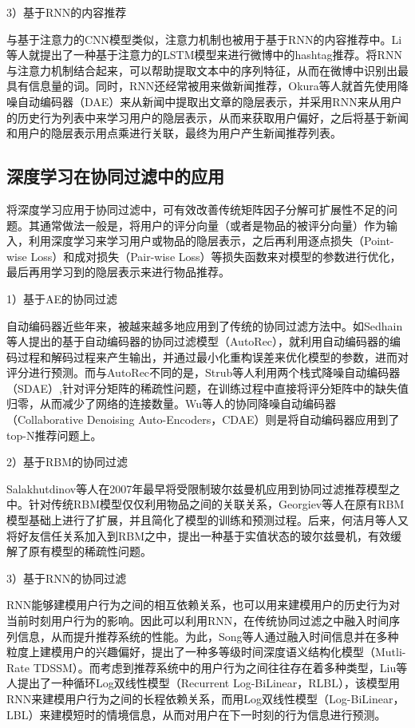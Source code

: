 3）基于RNN的内容推荐

与基于注意力的CNN模型类似，注意力机制也被用于基于RNN的内容推荐中。Li等人\cite{LiLJZ16HashtagRNN}就提出了一种基于注意力的LSTM模型来进行微博中的hashtag推荐。将RNN与注意力机制结合起来，可以帮助提取文本中的序列特征，从而在微博中识别出最具有信息量的词。同时，RNN还经常被用来做新闻推荐，Okura等人\cite{OkuraTOT17NewsRecRNN}就首先使用降噪自动编码器（DAE）来从新闻中提取出文章的隐层表示，并采用RNN来从用户的历史行为列表中来学习用户的隐层表示，从而来获取用户偏好，之后将基于新闻和用户的隐层表示用点乘进行关联，最终为用户产生新闻推荐列表。

\subsection{深度学习在协同过滤中的应用}
将深度学习应用于协同过滤中，可有效改善传统矩阵因子分解可扩展性不足的问题\cite{SalakhutdinovMH07RBM}。其通常做法一般是，将用户的评分向量（或者是物品的被评分向量）作为输入，利用深度学习来学习用户或物品的隐层表示，之后再利用逐点损失（Point-wise Loss）和成对损失（Pair-wise Loss）等损失函数来对模型的参数进行优化\cite{WuDZE16CDAE}，最后再用学习到的隐层表示来进行物品推荐。

1）基于AE的协同过滤

自动编码器近些年来，被越来越多地应用到了传统的协同过滤方法中。如Sedhain等人\cite{SedhainMSX15AECF}提出的基于自动编码器的协同过滤模型（AutoRec），就利用自动编码器的编码过程和解码过程来产生输出，并通过最小化重构误差来优化模型的参数，进而对评分进行预测。而与AutoRec不同的是，Strub等人\cite{CFSDAE}利用两个栈式降噪自动编码器（SDAE）,针对评分矩阵的稀疏性问题，在训练过程中直接将评分矩阵中的缺失值归零，从而减少了网络的连接数量。Wu等人\cite{WuDZE16CDAE}的协同降噪自动编码器（Collaborative Denoising Auto-Encoders，CDAE）则是将自动编码器应用到了top-N推荐问题上。

2）基于RBM的协同过滤

Salakhutdinov等人\cite{TruyenPV09BMCF}在2007年最早将受限制玻尔兹曼机应用到协同过滤推荐模型之中。针对传统RBM模型仅仅利用物品之间的关联关系，Georgiev等人\cite{GeorgievN13NONIID}在原有RBM模型基础上进行了扩展，并且简化了模型的训练和预测过程。后来，何洁月等人\cite{HeJieYue}又将好友信任关系加入到RBM之中，提出一种基于实值状态的玻尔兹曼机，有效缓解了原有模型的稀疏性问题。

3）基于RNN的协同过滤

RNN能够建模用户行为之间的相互依赖关系，也可以用来建模用户的历史行为对当前时刻用户行为的影响。因此可以利用RNN，在传统协同过滤之中融入时间序列信息，从而提升推荐系统的性能。为此，Song等人\cite{SongEH16DL4TR}通过融入时间信息并在多种粒度上建模用户的兴趣偏好，提出了一种多等级时间深度语义结构化模型（Mutli-Rate TDSSM）。而考虑到推荐系统中的用户行为之间往往存在着多种类型，Liu等人\cite{LiuWW17RLBL}提出了一种循环Log双线性模型（Recurrent Log-BiLinear，RLBL），该模型用RNN来建模用户行为之间的长程依赖关系，而用Log双线性模型（Log-BiLinear，LBL）\cite{MnihH07LBL}来建模短时的情境信息，从而对用户在下一时刻的行为信息进行预测。

